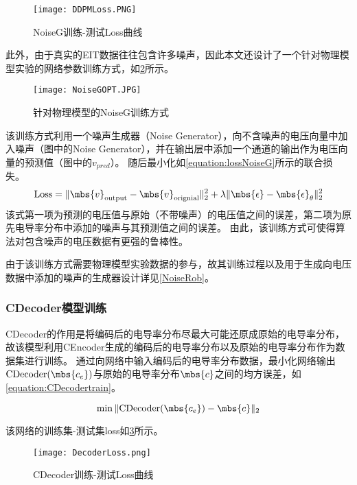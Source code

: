 \begin{figure}[H]
    \centering
    \texttt{[image: DDPMLoss.PNG]}
    \caption{NoiseG训练-测试Loss曲线}
    \label{figure:DDPMLoss}
\end{figure}

此外，由于真实的EIT数据往往包含许多噪声，因此本文还设计了一个针对物理模型实验的网络参数训练方式，如\cref{figure:NoiseGOPT}所示。

\begin{figure}[h]
    \centering
    \texttt{[image: NoiseGOPT.JPG]}
    \caption{针对物理模型的NoiseG训练方式}
    \label{figure:NoiseGOPT}
\end{figure}

该训练方式利用一个噪声生成器（Noise Generator），向不含噪声的电压向量中加入噪声（图中的Noise Generator），并在输出层中添加一个通道的输出作为电压向量的预测值（图中的$v_{pred}$）。
随后最小化如\cref{equation:lossNoiseG}所示的联合损失。
\begin{equation}
    \centering
    \text{Loss} = \|\mbs{v}_{\text{output}} - \mbs{v}_{\text{orignial}}\|^2_2 + \lambda\| \mbs{\epsilon} - \mbs{\epsilon}_\theta\|^2_2
    \label{equation:lossNoiseG}
\end{equation}
该式第一项为预测的电压值与原始（不带噪声）的电压值之间的误差，第二项为原先电导率分布中添加的噪声与其预测值之间的误差。
由此，该训练方式可使得算法对包含噪声的电压数据有更强的鲁棒性。

由于该训练方式需要物理模型实验数据的参与，故其训练过程以及用于生成向电压数据中添加的噪声的生成器设计详见\cref{NoiseRob}。



\subsubsection{CDecoder模型训练}

CDecoder的作用是将编码后的电导率分布尽最大可能还原成原始的电导率分布，故该模型利用CEncoder生成的编码后的电导率分布以及原始的电导率分布作为数据集进行训练。
通过向网络中输入编码后的电导率分布数据，最小化网络输出$\text{CDecoder}(\mbs{c_e})$与原始的电导率分布$\mbs{c}$之间的均方误差，如\cref{equation:CDecodertrain}。

\begin{equation}
    \label{equation:CDecodertrain}
    \min \|\text{CDecoder}(\mbs{c_e}) - \mbs{c}\|_2
\end{equation}

该网络的训练集-测试集loss如\cref{figure:DecoderLoss}所示。
\begin{figure}[h]
    \centering
    \texttt{[image: DecoderLoss.png]}
    \caption{CDecoder训练-测试Loss曲线}
    \label{figure:DecoderLoss}
\end{figure} 

